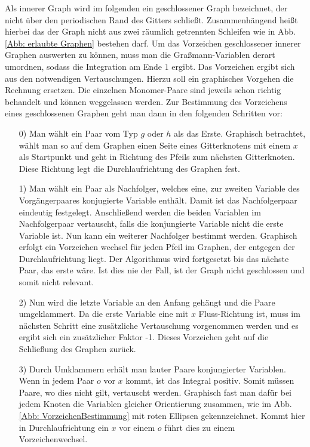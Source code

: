 Als innerer Graph wird im folgenden ein geschlossener Graph bezeichnet, der nicht über den periodischen Rand des Gitters schließt. Zusammenhängend heißt hierbei das der Graph nicht aus zwei räumlich getrennten Schleifen wie in Abb. \ref{Abb: erlaubte Graphen} bestehen darf.
Um das Vorzeichen geschlossener innerer Graphen auswerten zu können, muss man die Graßmann-Variablen derart umordnen, sodass die Integration am Ende $1$ ergibt. Das Vorzeichen ergibt sich aus den notwendigen Vertauschungen. Hierzu soll ein graphisches Vorgehen die Rechnung ersetzen. Die einzelnen Monomer-Paare sind jeweils schon richtig behandelt und können weggelassen werden. Zur Bestimmung des Vorzeichens eines geschlossenen Graphen geht man dann in den folgenden Schritten vor:

\begin{itemize}
\item[0)] Man wählt ein Paar vom Typ $g$ oder $h$ als das Erste. Graphisch betrachtet, wählt man so auf dem Graphen einen Seite eines Gitterknotens mit einem $x$ als Startpunkt und geht in Richtung des Pfeils zum nächsten Gitterknoten. Diese Richtung legt die Durchlaufrichtung des Graphen fest. 
\item[1)] Man wählt ein Paar als Nachfolger, welches eine, zur zweiten Variable des Vorgängerpaares konjugierte Variable enthält. Damit ist das Nachfolgerpaar eindeutig festgelegt. Anschließend werden die beiden Variablen im Nachfolgerpaar vertauscht, falls die konjungierte Variable nicht die erste Variable ist. Nun kann ein weiterer Nachfolger bestimmt werden. Graphisch erfolgt ein Vorzeichen wechsel für jeden Pfeil im Graphen, der entgegen der Durchlaufrichtung liegt.
Der Algorithmus wird fortgesetzt bis das nächste Paar, das erste wäre. Ist dies nie der Fall, ist der Graph nicht geschlossen und somit nicht relevant.
\item[2)] Nun wird die letzte Variable an den Anfang gehängt und die Paare umgeklammert. Da die erste Variable eine mit $x$ Fluss-Richtung ist, muss im nächsten Schritt eine zusätzliche Vertauschung vorgenommen werden und es ergibt sich ein zusätzlicher Faktor -1. Dieses Vorzeichen geht auf die Schließung des Graphen zurück.
\item[3)] Durch Umklammern erhält man lauter Paare konjungierter Variablen. Wenn in jedem Paar $o$ vor $x$ kommt, ist das Integral positiv. Somit müssen Paare, wo dies nicht gilt, vertauscht werden. Graphisch fast man dafür bei jedem Knoten die Variablen gleicher Orientierung zusammen, wie im Abb. \ref{Abb: VorzeichenBestimmung} mit roten Ellipsen gekennzeichnet. Kommt hier in Durchlaufrichtung ein $x$ vor einem $o$ führt dies zu einem Vorzeichenwechsel.  
\end{itemize}

